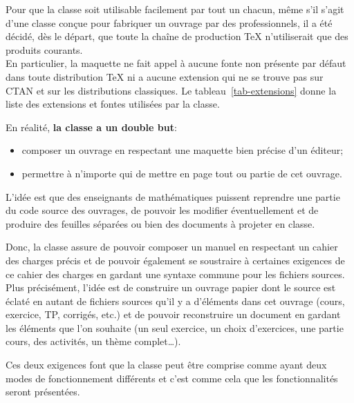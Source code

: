 \documentclass[nocrop]{sesamanuel}
\begin{document}
\renewcommand{\StringDOCUMENTATION}{Principe}
\begin{documentation}
Pour que la classe soit utilisable facilement par tout un chacun, même
s'il s'agit d'une classe conçue pour fabriquer un ouvrage par des
professionnels, il a été décidé, dès le départ, que toute la chaîne de
production \TeX{} n'utiliserait que des produits courants. \\En particulier,
la maquette ne fait appel à aucune fonte non présente par défaut dans
toute distribution \TeX{} ni a aucune extension qui ne se trouve pas
sur CTAN et sur les distributions classiques. Le
tableau~\ref{tab-extensions} donne la liste des extensions et fontes
utilisées par la classe.

En réalité, {\bfseries la classe a un double but}: 
\begin{itemize}
 \item 
composer un ouvrage en
respectant une maquette bien précise d'un éditeur; 
\item permettre à
n'importe qui de mettre en page tout ou partie de cet ouvrage.
\end{itemize} L'idée
est que des enseignants de mathématiques puissent reprendre une partie
du code source des ouvrages, de pouvoir les modifier éventuellement et
de produire des feuilles séparées ou bien des documents à projeter en
classe.

Donc, la classe assure de pouvoir composer un manuel en respectant un
cahier des charges précis et de pouvoir également se soustraire à
certaines exigences de ce cahier des charges en gardant une syntaxe
commune pour les fichiers sources. \\Plus précisément, l'idée est de
construire un ouvrage papier dont le source est éclaté en autant de
fichiers sources qu'il y a d'éléments dans cet ouvrage (cours,
exercice, TP, corrigés, etc.) et de pouvoir reconstruire un document
en gardant les éléments que l'on souhaite (un seul
exercice, un choix d'exercices, une partie cours, des activités, un
thème complet\ldots).

Ces deux exigences font que la classe peut être comprise comme ayant
deux modes de fonctionnement différents et c'est comme cela que les
fonctionnalités seront présentées.

\end{documentation}
\end{document}
